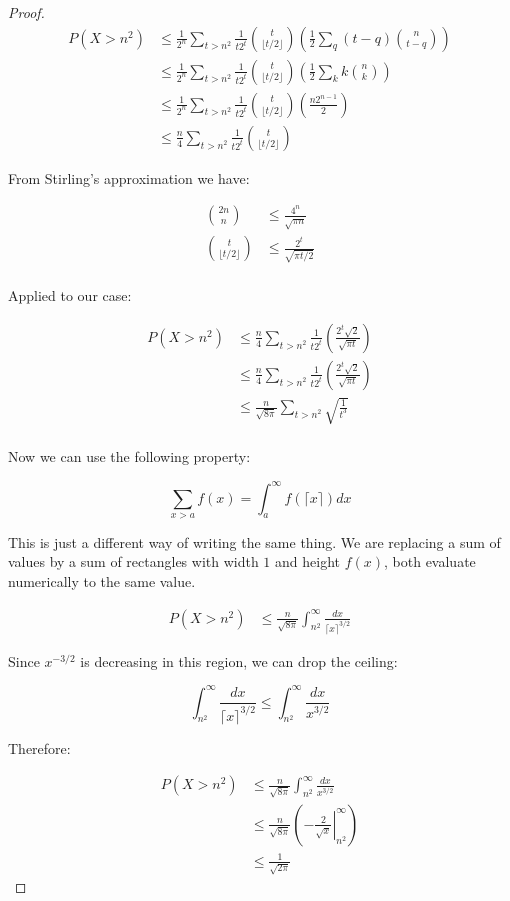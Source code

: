 \documentclass[10pt]{book}
\begin{document}
\begin{proof}
\begin{align*}
  P(X > n^2) 
  &\le \frac{1}{2^n}\sum_{t>n^2} \frac{1}{t2^t}{t\choose\lfloor t/2\rfloor}
       \left(
       \frac{1}{2}\sum_q(t-q){n \choose t-q}
       \right) \\
  &\le \frac{1}{2^n}\sum_{t>n^2} \frac{1}{t2^t}{t\choose\lfloor t/2\rfloor}
       \left(
         \frac{1}{2}\sum_k k{n \choose k}
       \right)\\
  &\le \frac{1}{2^n}\sum_{t>n^2} \frac{1}{t2^t}{t\choose\lfloor t/2\rfloor}
       \left(
         \frac{n2^{n-1}}{2}
       \right)\\
  &\le \frac{n}{4}\sum_{t>n^2} \frac{1}{t2^t}{t\choose\lfloor t/2\rfloor}
\end{align*}

From Stirling's approximation we have:

\begin{align*}
  {2n\choose n}&\le \frac{4^n}{\sqrt{\pi n}} \\
  {t\choose \lfloor t/2\rfloor}&\le \frac{2^{t}}{\sqrt{\pi t/2}} \\
\end{align*}

Applied to our case:

\begin{align*}
  P(X > n^2) 
  &\le \frac{n}{4}\sum_{t>n^2} \frac{1}{t2^t}\left(\frac{2^t\sqrt{2}}{\sqrt{\pi t}}\right)\\
  &\le \frac{n}{4}\sum_{t>n^2} \frac{1}{t2^t}\left(\frac{2^t\sqrt{2}}{\sqrt{\pi t}}\right)\\
  &\le \frac{n}{\sqrt{8\pi}}\sum_{t>n^2} \sqrt{\frac{1}{t^3}}\\
\end{align*}

Now we can use the following property:

$$\sum_{x>a}f(x)=\int_a^\infty f(\lceil x\rceil)dx$$

This is just a different way of writing the same thing. We are replacing a sum of values by a sum of rectangles with width $1$ and height $f(x)$, both evaluate numerically to the same value.

\begin{align*}
  P(X > n^2) 
  &\le \frac{n}{\sqrt{8\pi}}\int_{n^2}^\infty \frac{dx}{\lceil x\rceil^{3/2}}
\end{align*}

Since $x^{-3/2}$ is decreasing in this region, we can drop the ceiling:

$$\int_{n^2}^\infty\frac{dx}{\lceil x\rceil^{3/2}} \le 
  \int_{n^2}^\infty\frac{dx}{x^{3/2}} $$

Therefore:

\begin{align*}
  P(X > n^2) 
  &\le \frac{n}{\sqrt{8\pi}}\int_{n^2}^\infty \frac{dx}{ x^{3/2}} \\
  &\le \frac{n}{\sqrt{8\pi}}\left(\left.-\frac{2}{\sqrt{x}}
       \right\rvert^\infty_{n^2}\right) \\
  &\le \frac{1}{\sqrt{2\pi}}
\end{align*}





\end{proof}
\end{document}
